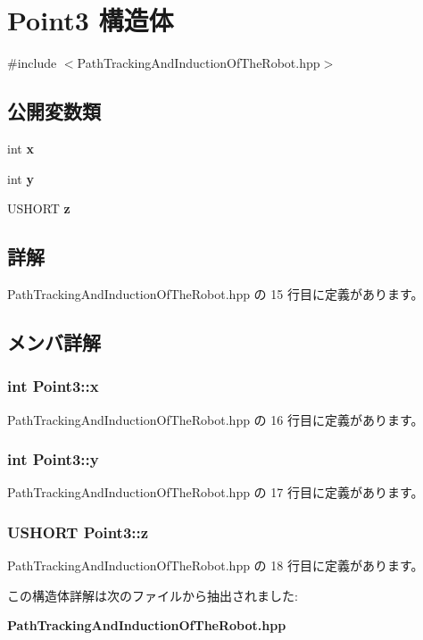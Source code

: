 \section{Point3 構造体}
\label{struct_point3}


{\ttfamily \#include $<$Path\-Tracking\-And\-Induction\-Of\-The\-Robot.\-hpp$>$}

\subsection*{公開変数類}
\begin{DoxyCompactItemize}
\item 
int {\bf x}
\item 
int {\bf y}
\item 
U\-S\-H\-O\-R\-T {\bf z}
\end{DoxyCompactItemize}


\subsection{詳解}


 Path\-Tracking\-And\-Induction\-Of\-The\-Robot.\-hpp の 15 行目に定義があります。



\subsection{メンバ詳解}
\subsubsection[{x}]{\setlength{\rightskip}{0pt plus 5cm}int Point3\-::x}\label{struct_point3_a92f702275b1efaf2f94dd1ec4906eddc}


 Path\-Tracking\-And\-Induction\-Of\-The\-Robot.\-hpp の 16 行目に定義があります。

\subsubsection[{y}]{\setlength{\rightskip}{0pt plus 5cm}int Point3\-::y}\label{struct_point3_ab6971f71fa10eb79349cd2fdb88ec3f2}


 Path\-Tracking\-And\-Induction\-Of\-The\-Robot.\-hpp の 17 行目に定義があります。

\subsubsection[{z}]{\setlength{\rightskip}{0pt plus 5cm}U\-S\-H\-O\-R\-T Point3\-::z}\label{struct_point3_a205a0d0ecf33c38941118591a5b5a1e2}


 Path\-Tracking\-And\-Induction\-Of\-The\-Robot.\-hpp の 18 行目に定義があります。



この構造体詳解は次のファイルから抽出されました\-:\begin{DoxyCompactItemize}
\item 
{\bf Path\-Tracking\-And\-Induction\-Of\-The\-Robot.\-hpp}\end{DoxyCompactItemize}
